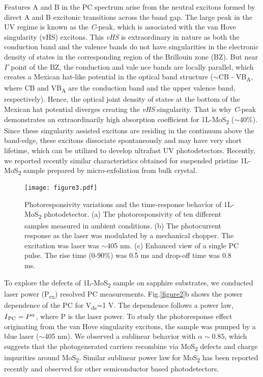 \documentclass[%
 reprint,%
 amssymb, amsmath,%
 aip,cha,%
]{revtex4-1}
\begin{document}
Features A and B in the PC spectrum arise from the neutral excitons formed by direct A and B excitonic transitions across the band gap.\cite{27, 31, 32} The large peak in the UV regime is known as the \textit{C}-peak, which is associated with the van Hove singularity (vHS) excitons.\cite{27, 33} This \textit{vHS} is extraordinary in nature as both the conduction band and the valence bands do not have singularities in the electronic density of states in the corresponding region of the Brillouin zone (BZ).\cite{27, 33} But near $\Gamma$ point of the BZ, the conduction and vale nce bands are locally parallel, which creates a Mexican hat-like potential in the optical band structure ($\sim$CB - VB\textsubscript{A}, where CB and VB\textsubscript{A} are the conduction band and the upper valence band, respectively). Hence, the optical joint density of states at the bottom of the Mexican hat potential diverges creating the \textit{vHS} singularity. That is why \textit{C}-peak demonstrates an extraordinarily high absorption coefficient for 1L-MoS\textsubscript{2} ($\sim$40\%).\cite{33, 34, 7} Since these singularity assisted excitons are residing in the continuum above the band-edge, these excitons dissociate spontaneously and may have very short lifetime, which can be utilized to develop ultrafast UV photodetectors. Recently, we reported recently similar characteristics obtained for suspended pristine 1L-MoS\textsubscript{2} sample prepared by micro-exfoliation from bulk crystal.\cite{27}

\begin{figure*}[t]
\centering
\begin{minipage}{\textwidth}
\texttt{[image: figure3.pdf]}
\caption{Photoresponsivity variations and the time-response behavior of 1L-MoS\textsubscript{2} photodetector. (a) The photoresponsivity of ten different samples measured in ambient conditions. (b) The photocurrent response as the laser was modulated by a mechanical chopper. The excitation was laser was $\sim$405 nm. (c) Enhanced view of a single PC pulse. The rise time (0-90\%) was 0.5 ms and drop-off time was 0.8 ms. \label{figure3}} 
\end{minipage}
\end{figure*}

To explore the defects of 1L-MoS\textsubscript{2} sample on sapphire substrates, we conducted laser power (P\textsubscript{ex}) resolved PC measurements. Fig.\ref{figure2}b shows the power dependence of the PC for V\textsubscript{ds}=1 V. The dependence follows a power law, $I\textsubscript{PC} = P^\alpha$, where P is the laser power. To study the photoresponse effect originating from the van Hove singularity excitons, the sample was pumped by a blue laser ($\sim$405 nm). We observed a sublinear behavior with $\alpha\sim 0.85$, which suggests that the photogenerated carriers recombine via MoS\textsubscript{2} defects and charge impurities around MoS\textsubscript{2}.\cite{20} Similar sublinear power law for MoS\textsubscript{2} has been reported recently\cite{35} and observed for other semiconductor based photodetectors. \cite{36, 37}
\end{document}
